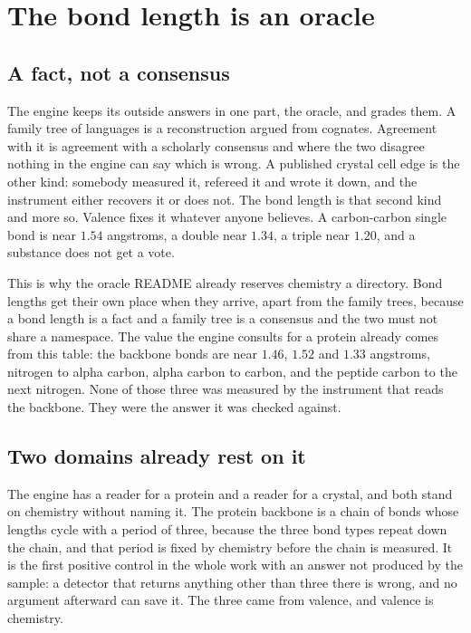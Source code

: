 \chapter{The bond length is an oracle}

\section{A fact, not a consensus}

The engine keeps its outside answers in one part, the oracle, and grades them. A family tree of
languages is a reconstruction argued from cognates. Agreement with it is agreement with a
scholarly consensus and where the two disagree nothing in the engine can say which is wrong. A
published crystal cell edge is the other kind: somebody measured it, refereed it and wrote it down,
and the instrument either recovers it or does not. The bond length is that second kind and more so.
Valence fixes it whatever anyone believes. A carbon-carbon single bond is near $1.54$ angstroms, a
double near $1.34$, a triple near $1.20$, and a substance does not get a vote.

This is why the oracle README already reserves chemistry a directory. Bond lengths get their own
place when they arrive, apart from the family trees, because a bond length is a fact and a family
tree is a consensus and the two must not share a namespace. The value the engine consults for a
protein already comes from this table: the backbone bonds are near $1.46$, $1.52$ and $1.33$
angstroms, nitrogen to alpha carbon, alpha carbon to carbon, and the peptide carbon to the next
nitrogen. None of those three was measured by the instrument that reads the backbone. They were the
answer it was checked against.

\section{Two domains already rest on it}

The engine has a reader for a protein and a reader for a crystal, and both stand on chemistry without
naming it. The protein backbone is a chain of bonds whose lengths cycle with a period of three,
because the three bond types repeat down the chain, and that period is fixed by chemistry before the
chain is measured. It is the first positive control in the whole work with an answer not produced by
the sample: a detector that returns anything other than three there is wrong, and no argument
afterward can save it. The three came from valence, and valence is chemistry.

